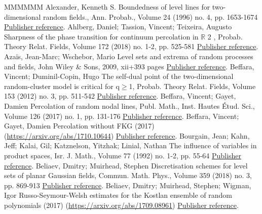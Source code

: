 \documentclass[11pt]{article}
\theoremstyle{definition}
\numberwithin{equation}{section}
\begin{document}
\begin{thebibliography}{MMMMMM}
 Alexander, Kenneth S. Boundedness of level lines for two-dimensional random fields., Ann. Probab., Volume 24 (1996) no. 4, pp. 1653-1674 \href{https://ahl.centre-mersenne.org/item/AHL_2020__3__169_0/#alex_96}{Publisher reference}.
 Ahlberg, Daniel; Tassion, Vincent; Teixeira, Augusto Sharpness of the phase transition for continuum percolation in \ensuremath{\mathbb{R}} 2 , Probab. Theory Relat. Fields, Volume 172 (2018) no. 1-2, pp. 525-581 \href{https://ahl.centre-mersenne.org/item/AHL_2020__3__169_0/#ahlberg2016sharpness}{Publisher reference}.
 Azaïs, Jean-Marc; Wschebor, Mario Level sets and extrema of random processes and fields, John Wiley \& Sons, 2009, xii+393 pages \href{https://ahl.centre-mersenne.org/item/AHL_2020__3__169_0/#azws}{Publisher reference}.
 Beffara, Vincent; Duminil-Copin, Hugo The self-dual point of the two-dimensional random-cluster model is critical for q\ensuremath{\geq}1, Probab. Theory Relat. Fields, Volume 153 (2012) no. 3, pp. 511-542 \href{https://ahl.centre-mersenne.org/item/AHL_2020__3__169_0/#beffara2012self}{Publisher reference}.
 Beffara, Vincent; Gayet, Damien Percolation of random nodal lines, Publ. Math., Inst. Hautes Étud. Sci., Volume 126 (2017) no. 1, pp. 131-176 \href{https://ahl.centre-mersenne.org/item/AHL_2020__3__169_0/#bg_16}{Publisher reference}.
 Beffara, Vincent; Gayet, Damien Percolation without FKG (2017) (\url{https://arxiv.org/abs/1710.10644}) \href{https://ahl.centre-mersenne.org/item/AHL_2020__3__169_0/#bg_17}{Publisher reference}.
 Bourgain, Jean; Kahn, Jeff; Kalai, Gil; Katznelson, Yitzhak; Linial, Nathan The influence of variables in product spaces, Isr. J. Math., Volume 77 (1992) no. 1-2, pp. 55-64 \href{https://ahl.centre-mersenne.org/item/AHL_2020__3__169_0/#bourgain1992influence}{Publisher reference}.
 Beliaev, Dmitry; Muirhead, Stephen Discretisation schemes for level sets of planar Gaussian fields, Commun. Math. Phys., Volume 359 (2018) no. 3, pp. 869-913 \href{https://ahl.centre-mersenne.org/item/AHL_2020__3__169_0/#bm_17}{Publisher reference}.
 Beliaev, Dmitry; Muirhead, Stephen; Wigman, Igor Russo-Seymour-Welsh estimates for the Kostlan ensemble of random polynomials (2017) (\url{https://arxiv.org/abs/1709.08961}) \href{https://ahl.centre-mersenne.org/item/AHL_2020__3__169_0/#bmw_17}{Publisher reference}.

\end{thebibliography}
\end{document}
